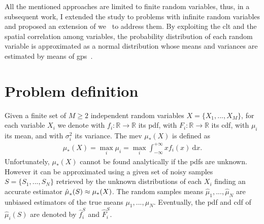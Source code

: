 All the mentioned approaches are limited to finite random variables, thus, in a subsequent work, I extended the study to problems with infinite random variables and proposed an extension of \gls{we}~\cite{deramo2017maximum} to address them. By exploiting the \gls{clt} and the spatial correlation among variables, the probability distribution of each random variable is approximated as a normal distribution whose means and variances are estimated by means of \glspl{gp}~\cite{rasmussen2005gaussian}.

\section{Problem definition}
Given a finite set of $M \geq 2$ independent random variables $X = \lbrace X_{1}, ..., X_{M} \rbrace$, for each variable $X_i$ we denote with $f_i : \mathbb{R} \rightarrow \mathbb{R}$ its \gls{pdf}, with $F_i : \mathbb{R} \rightarrow \mathbb{R}$ its \gls{cdf}, with $\mu_i$ its mean, and with $\sigma^2_i$ its variance.
The \gls{mev} $\mu_{*}(X)$ is defined as
\begin{align}\label{E:maxExp}
\mu_{*}(X) = \max_{i} \mu_{i} = \max_{i} \int_{-\infty}^{+\infty}xf_i(x)~\mathrm{d}x.
\end{align}
Unfortunately, $\mu_{*}(X)$ cannot be found analytically if the \glspl{pdf} are unknown.
However it can be approximated using a given set of noisy samples $S = \lbrace S_{1}, ..., S_{N} \rbrace$ retrieved by the unknown distributions of each $X_{i}$ finding an accurate estimator $\hat\mu_*^{}(S) \approx \mu_{*}(X)$. 
The random samples means $\hat{\mu}_{1}, ..., \hat{\mu}_{N}$ are unbiased estimators of the true means $\mu_{1}, ..., \mu_{N}$.
Eventually, the \gls{pdf} and \gls{cdf} of $\hat{\mu}_{i}(S)$ are denoted by $\hat f_i^S$ and $\hat F_i^S$.

